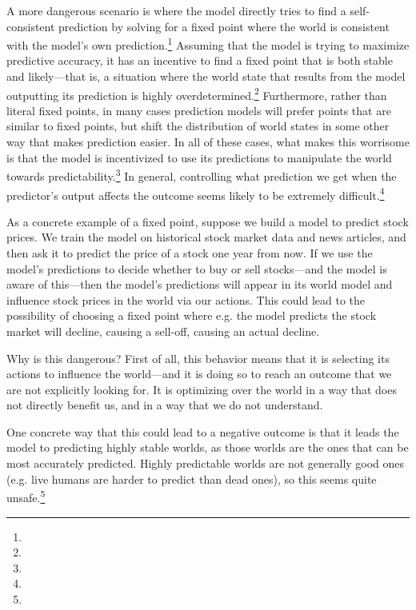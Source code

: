 {A more dangerous scenario is where the model directly tries to find a self-consistent prediction by solving for a fixed point where the world is consistent with the model's own prediction\cite{TODO: cite https://www.alignmentforum.org/posts/dWJNFHnC4bkdbovug/training-goals-for-large-language-models}.\footnote{} Assuming that the model is trying to maximize predictive accuracy, it has an incentive to find a fixed point that is both stable and likely---that is, a situation where the world state that results from the model outputting its prediction is highly overdetermined.\footnote{} Furthermore, rather than literal fixed points, in many cases prediction models will prefer points that are similar to fixed points, but shift the distribution of world states in some other way\cite{TODO: cite https://www.alignmentforum.org/posts/Aufg88v7mQ2RuEXkS/proper-scoring-rules-don-t-guarantee-predicting-fixed-points} that makes prediction easier. In all of these cases, what makes this worrisome is that the model is incentivized to use its predictions to manipulate the world towards predictability.\footnote{} In general, controlling what prediction we get when the predictor's output affects the outcome seems likely to be extremely difficult.\footnote{}

As a concrete example of a fixed point, suppose we build a model to predict stock prices. We train the model on historical stock market data and news articles, and then ask it to predict the price of a stock one year from now. If we use the model's predictions to decide whether to buy or sell stocks---and the model is aware of this---then the model's predictions will appear in its world model and influence stock prices in the world via our actions. This could lead to the possibility of choosing a fixed point where e.g. the model predicts the stock market will decline, causing a sell-off, causing an actual decline.

Why is this dangerous? First of all, this behavior means that it is selecting its actions to influence the world---and it is doing so to reach an outcome that we are not explicitly looking for. It is optimizing over the world in a way that does not directly benefit us, and in a way that we do not understand.

One concrete way that this could lead to a negative outcome is that it leads the model to predicting highly stable worlds, as those worlds are the ones that can be most accurately predicted. Highly predictable worlds are not generally good ones (e.g. live humans are harder to predict than dead ones), so this seems quite unsafe.\footnote{}

}
